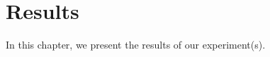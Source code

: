 \documentclass[../main]{subfiles}
\begin{document}
\chapter{Results}

\label{ch:results}
In this chapter, we present the results of our experiment(s). 
\end{document}
